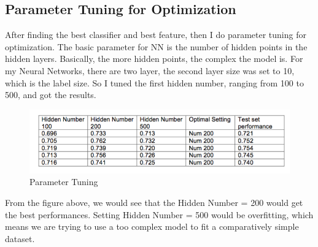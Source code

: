 \subsection{Parameter Tuning for Optimization}
After finding the best classifier and best feature, then I do parameter tuning
for optimization. The basic parameter for NN is the number of hidden points in
the hidden layers. Basically, the more hidden points, the complex the model is.
For my Neural Networks, there are two layer, the second layer size was set to
10, which is the label size. So I tuned the first hidden number, ranging from
100 to 500, and got the results.


\begin{figure}[!htbp]
    \centering
    \includegraphics[width=14cm]{./pic/Result.png}
    \caption{Parameter Tuning}
\end{figure}

From the figure above, we would see that the Hidden Number = 200 would get the
best performances. Setting Hidden Number = 500 would be overfitting, which means
we are trying to use a too complex model to fit a comparatively simple dataset.

